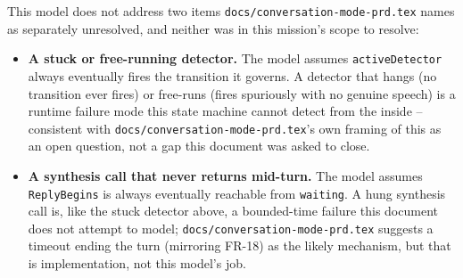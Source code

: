 \documentclass[a4paper,10pt,fleqn]{article}
\begin{document}
This model does not address two items \texttt{docs/conversation-mode-prd.tex}
names as separately unresolved, and neither was in this mission's scope to
resolve:

\begin{itemize}
  \item \textbf{A stuck or free-running detector.} The model assumes
    \texttt{activeDetector} always eventually fires the transition it
    governs. A detector that hangs (no transition ever fires) or free-runs
    (fires spuriously with no genuine speech) is a runtime failure mode
    this state machine cannot detect from the inside -- consistent with
    \texttt{docs/conversation-mode-prd.tex}'s own framing of this as an open
    question, not a gap this document was asked to close.
  \item \textbf{A synthesis call that never returns mid-turn.} The model
    assumes \texttt{ReplyBegins} is always eventually reachable from
    \texttt{waiting}. A hung synthesis call is, like the stuck detector
    above, a bounded-time failure this document does not attempt to model;
    \texttt{docs/conversation-mode-prd.tex} suggests a timeout ending the
    turn (mirroring FR-18) as the likely mechanism, but that is
    implementation, not this model's job.
\end{itemize}
\end{document}
